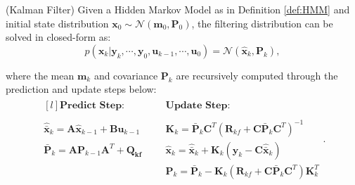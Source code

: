 \documentclass[a4paper,11pt]{book}
\numberwithin{figure}{chapter}
\numberwithin{equation}{chapter}
\numberwithin{table}{chapter}
\newtheorem{theorem}{Theorem}[chapter]
\theoremstyle{definition}
\newcounter{boxed-theorem}
\newenvironment{boxed-theorem}[1]
{\colorlet{shadecolor}{pastelBlue2!10} \begin{shaded} \begin{theorem}{#1}}
{\end{theorem} \end{shaded}}
\newcounter{boxed-definition}
\newcounter{boxed-example}
\begin{document}
\begin{boxed-theorem}{(Kalman Filter)} \label{th:kalmanFilter}
    Given a Hidden Markov Model as in Definition \ref{def:HMM} and initial state distribution $\bm{x}_0 \sim \mathcal{N}(\bm{m}_0, \bm{P}_0)$, the filtering distribution can be solved in closed-form as:
    \begin{equation}
        p(\bm{x}_k | \bm{y}_{k}, \cdots, \bm{y}_0, \bm{u}_{k-1}, \cdots, \bm{u}_0)  = \mathcal{N}(\hat{\bm{x}}_k, \bm{P}_k)
    ,\end{equation}   
    
    \noindent where the mean $\bm{m}_k$ and covariance $\bm{P}_k$ are recursively computed through the prediction and update steps below:
    \begin{align}
    \begin{matrix*}[l]
    \textbf{Predict Step:} & & & \textbf{Update Step:} \\ \\
    \hat{\bar{\bm{x}}}_k = \bm{A} \hat{\bm{x}}_{k-1} + \bm{B} \bm{u}_{k-1} & & & \bm{K}_k = \bar{\bm{P}}_k \bm{C}^T (\bm{R}_{kf} + \bm{C} \bar{\bm{P}}_k \bm{C}^T)^{-1} \\
    \bar{\bm{P}}_k = \bm{A} \bm{P}_{k-1} \bm{A}^T + \bm{Q_{kf}} & & & \hat{\bm{x}}_k = \hat{\bar{\bm{x}}}_k + \bm{K}_k(\bm{y}_k - \bm{C} \hat{\bar{\bm{x}}}_k)\ \\
    & & & \bm{P}_k = \bar{\bm{P}}_k - \bm{K}_k (\bm{R}_{kf} + \bm{C} \bar{\bm{P}}_k \bm{C}^T) \bm{K}_k^T
    \end{matrix*}   
    .\end{align}
\end{boxed-theorem}
\end{document}
